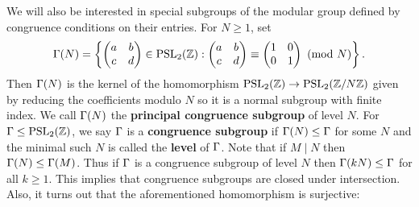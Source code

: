    We will also be interested in special subgroups of the modular group defined by congruence conditions on their entries. For $N \ge 1$, set
    \[
      \Gamma(N) = \left\{\begin{pmatrix} a & b \\ c & d \end{pmatrix} \in \mathrm{PSL}_{2}(\mathbb{Z}):\begin{pmatrix} a & b \\ c & d \end{pmatrix} \equiv \begin{pmatrix} 1 & 0 \\ 0 & 1 \end{pmatrix} \ (\mathrm{mod}\text{ }N)\right\}.
    \]
    Then $\Gamma(N)$ is the kernel of the homomorphism $\mathrm{PSL}_{2}(\mathbb{Z}) \to \mathrm{PSL}_{2}(\mathbb{Z}/N\mathbb{Z})$ given by reducing the coefficients modulo $N$ so it is a normal subgroup with finite index. We call $\Gamma(N)$ the \textbf{principal congruence subgroup} of level $N$. For $\Gamma \le \mathrm{PSL}_{2}(\mathbb{Z})$, we say $\Gamma$ is a \textbf{congruence subgroup} if $\Gamma(N) \le \Gamma$ for some $N$ and the minimal such $N$ is called the \textbf{level} of $\Gamma$. Note that if $M \mid N$ then $\Gamma(N) \le \Gamma(M)$. Thus if $\Gamma$ is a congruence subgroup of level $N$ then $\Gamma(kN) \le \Gamma$ for all $k \ge 1$. This implies that congruence subgroups are closed under intersection. Also, it turns out that the aforementioned homomorphism is surjective:

